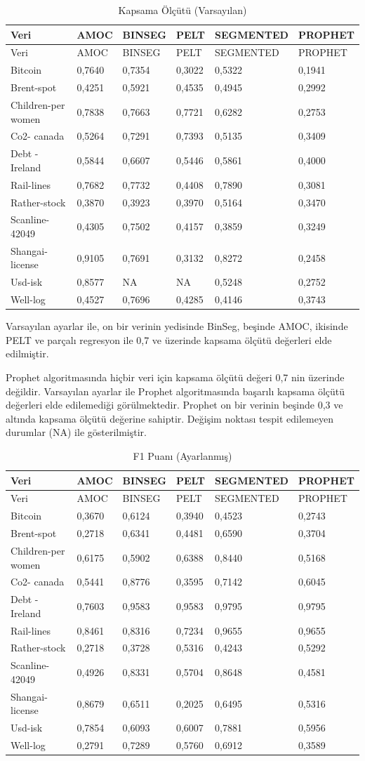 \documentclass[12pt,twoside]{deuthesis}
\begin{document}
\begin{longtable}[]{@{}llllll@{}}
\caption{\label{tab:nvar3} Kapsama Ölçütü (Varsayılan)}\tabularnewline
\toprule
Veri & AMOC & BINSEG & PELT & SEGMENTED & PROPHET\tabularnewline
\midrule
\endfirsthead
\toprule
Veri & AMOC & BINSEG & PELT & SEGMENTED & PROPHET\tabularnewline
\midrule
\endhead
Bitcoin & 0,7640 & 0,7354 & 0,3022 & 0,5322 & 0,1941\tabularnewline
Brent-spot & 0,4251 & 0,5921 & 0,4535 & 0,4945 & 0,2992\tabularnewline
Children-per women & 0,7838 & 0,7663 & 0,7721 & 0,6282 & 0,2753\tabularnewline
Co2- canada & 0,5264 & 0,7291 & 0,7393 & 0,5135 & 0,3409\tabularnewline
Debt -Ireland & 0,5844 & 0,6607 & 0,5446 & 0,5861 & 0,4000\tabularnewline
Rail-lines & 0,7682 & 0,7732 & 0,4408 & 0,7890 & 0,3081\tabularnewline
Rather-stock & 0,3870 & 0,3923 & 0,3970 & 0,5164 & 0,3470\tabularnewline
Scanline-42049 & 0,4305 & 0,7502 & 0,4157 & 0,3859 & 0,3249\tabularnewline
Shangai-license & 0,9105 & 0,7691 & 0,3132 & 0,8272 & 0,2458\tabularnewline
Usd-isk & 0,8577 & NA & NA & 0,5248 & 0,2752\tabularnewline
Well-log & 0,4527 & 0,7696 & 0,4285 & 0,4146 & 0,3743\tabularnewline
\bottomrule
\end{longtable}

Varsayılan ayarlar ile, on bir verinin yedisinde BinSeg, beşinde AMOC, ikisinde PELT ve parçalı regresyon ile 0,7 ve üzerinde kapsama ölçütü değerleri elde edilmiştir.

Prophet algoritmasında hiçbir veri için kapsama ölçütü değeri 0,7 nin üzerinde değildir.
Varsayılan ayarlar ile Prophet algoritmasında başarılı kapsama ölçütü değerleri elde edilemediği görülmektedir. Prophet on bir verinin beşinde 0,3 ve altında kapsama ölçütü değerine sahiptir.
Değişim noktası tespit edilemeyen durumlar (NA) ile gösterilmiştir.

\begin{longtable}[]{@{}llllll@{}}
\caption{\label{tab:nvar4} F1 Puanı (Ayarlanmış)}\tabularnewline
\toprule
Veri & AMOC & BINSEG & PELT & SEGMENTED & PROPHET\tabularnewline
\midrule
\endfirsthead
\toprule
Veri & AMOC & BINSEG & PELT & SEGMENTED & PROPHET\tabularnewline
\midrule
\endhead
Bitcoin & 0,3670 & 0,6124 & 0,3940 & 0,4523 & 0,2743\tabularnewline
Brent-spot & 0,2718 & 0,6341 & 0,4481 & 0,6590 & 0,3704\tabularnewline
Children-per women & 0,6175 & 0,5902 & 0,6388 & 0,8440 & 0,5168\tabularnewline
Co2- canada & 0,5441 & 0,8776 & 0,3595 & 0,7142 & 0,6045\tabularnewline
Debt -Ireland & 0,7603 & 0,9583 & 0,9583 & 0,9795 & 0,9795\tabularnewline
Rail-lines & 0,8461 & 0,8316 & 0,7234 & 0,9655 & 0,9655\tabularnewline
Rather-stock & 0,2718 & 0,3728 & 0,5316 & 0,4243 & 0,5292\tabularnewline
Scanline-42049 & 0,4926 & 0,8331 & 0,5704 & 0,8648 & 0,4581\tabularnewline
Shangai-license & 0,8679 & 0,6511 & 0,2025 & 0,6495 & 0,5316\tabularnewline
Usd-isk & 0,7854 & 0,6093 & 0,6007 & 0,7881 & 0,5956\tabularnewline
Well-log & 0,2791 & 0,7289 & 0,5760 & 0,6912 & 0,3589\tabularnewline
\bottomrule
\end{longtable}
\end{document}
